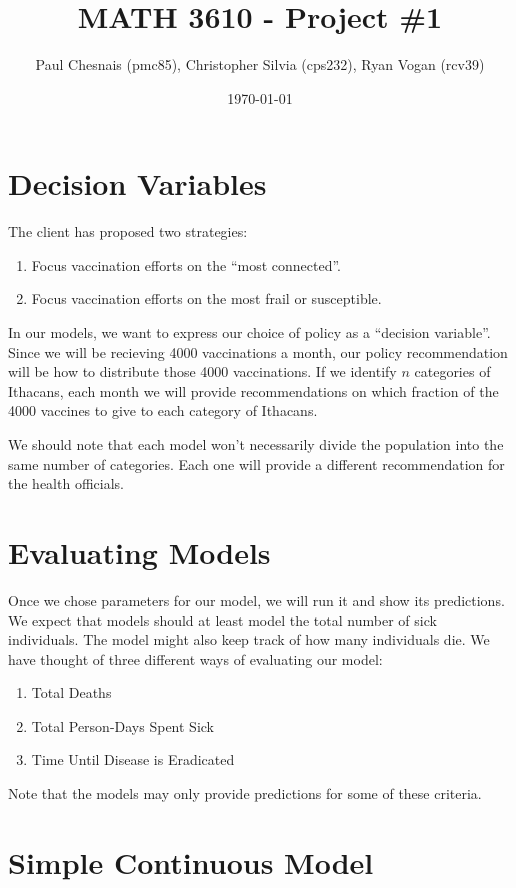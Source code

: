 \documentclass{article}
\title{MATH 3610 - Project \#1}
\author{Paul Chesnais (pmc85), Christopher Silvia (cps232), Ryan Vogan (rcv39)}
\date{\today}
\begin{document}
\maketitle
\thispagestyle{fancy}

\section{Decision Variables}

The client has proposed two strategies:

\begin{enumerate}
\item Focus vaccination efforts on the ``most connected''.
\item Focus vaccination efforts on the most frail or susceptible.
\end{enumerate}

In our models, we want to express our choice of policy as a ``decision variable''.
Since we will be recieving 4000 vaccinations a month, our policy recommendation
	will be how to distribute those 4000 vaccinations.
If we identify $n$ categories of Ithacans, each month we will provide 
	recommendations on which fraction of the 4000 vaccines to give to 
	each category of Ithacans.

We should note that each model won't necessarily divide the population into the
	same number of categories.
Each one will provide a different recommendation for the health officials.

\section{Evaluating Models}

Once we chose parameters for our model, we will run it and show its predictions.
We expect that models should at least model the total number of sick
	individuals.
The model might also keep track of how many individuals die.
We have thought of three different ways of evaluating our model:

\begin{enumerate}
\item Total Deaths
\item Total Person-Days Spent Sick
\item Time Until Disease is Eradicated
\end{enumerate}

Note that the models may only provide predictions for some of these criteria.

\section{Simple Continuous Model}
\end{document}
